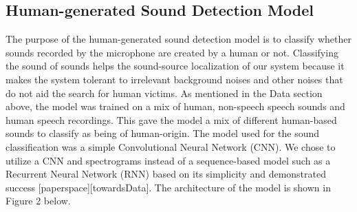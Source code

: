 \documentclass{article}
\begin{document}
\subsection{Human-generated Sound Detection Model}
The purpose of the human-generated sound detection model is to classify whether sounds recorded by the microphone are created by a human or not. Classifying the sound of sounds helps the sound-source localization of our system because it makes the system tolerant to irrelevant background noises and other noises that do not aid the search for human victims. As mentioned in the Data section above, the model was trained on a mix of human, non-speech speech sounds and human speech recordings. This gave the model a mix of different human-based sounds to classify as being of human-origin.
The model used for the sound classification was a simple Convolutional Neural Network (CNN). We chose to utilize a CNN and spectrograms instead of a sequence-based model such as a Recurrent Neural Network (RNN) based on its simplicity and demonstrated success [paperspace][towardsData]. The architecture of the model is shown in Figure 2 below.
\end{document}
